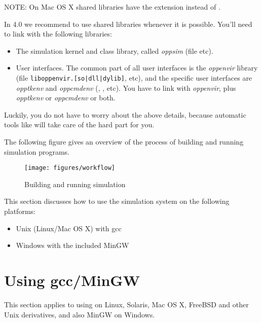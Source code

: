 NOTE: On Mac OS X shared libraries have the  extension instead of .

In {\opp} 4.0 we recommend to use shared libraries whenever it is possible.
You'll need to link with the following libraries:

\begin{itemize}
  \item{The simulation kernel and class library,
    called \textit{oppsim} (file  etc).}
  \item{User interfaces. The common part of all user interfaces is
    the \textit{oppenvir} library (file \texttt{liboppenvir.[so|dll|dylib]}, etc),
    and the specific user interfaces are \textit{opptkenv} and \textit{oppcmdenv}
    (, , etc).
    You have to link with \textit{oppenvir}, plus \textit{opptkenv} or
    \textit{oppcmdenv} or both.}
\end{itemize}

Luckily, you do not have to worry about the above details, because
automatic tools like  will take care of the hard
part for you.

The following figure gives an overview of the process of building
and running simulation programs.

\begin{figure}[htbp]
  \begin{center}
    \texttt{[image: figures/workflow]}
    \caption{Building and running simulation}
  \end{center}
\end{figure}


This section discusses how to use the simulation system on the
following platforms:
\begin{itemize}
  \item{Unix (Linux/Mac OS X) with gcc}
  \item{Windows with the included MinGW}
\end{itemize}


\section{Using gcc/MinGW}

This section applies to using {\opp} on Linux, Solaris, Mac OS X, FreeBSD and
other Unix derivatives, and also MinGW on Windows.

